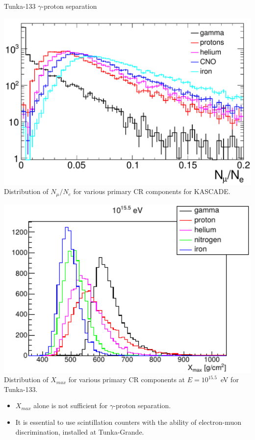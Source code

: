 \begin{frame}{Tunka-133 $\gamma$-proton separation}
\begin{minipage}[c]{0.49\textwidth}
  \begin{center}
    \includegraphics[width=1\textwidth]{pics/Nmu_Ne.pdf}\\
    Distribution of $N_\mu / N_e$ for various primary CR components for KASCADE.
  \end{center}
\end{minipage}
\hfill
\begin{minipage}[c]{0.49\textwidth}
  \begin{center}
    \includegraphics[width=1\textwidth]{pics/tunka_gamma_cr_diff.pdf}\\
    Distribution of $X_{max}$ for various primary CR components at $E = 10^{15.5}$~eV for Tunka-133.
  \end{center}
\end{minipage}
\vspace{1ex}
\begin{itemize}
  \item $X_{max}$ alone is not sufficient for $\gamma$-proton separation.
  \item It is essential to use scintillation counters with the ability of electron-muon discrimination, installed at Tunka-Grande.
\end{itemize}
\end{frame}
